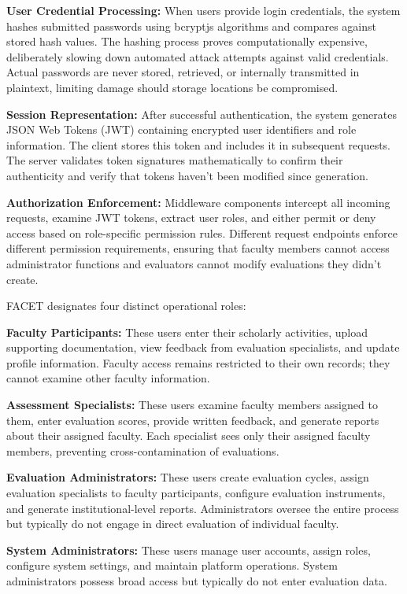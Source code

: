 \documentclass[conference]{IEEEtran}
\begin{document}
\textbf{User Credential Processing:} When users provide login credentials, the system hashes submitted passwords using bcryptjs algorithms and compares against stored hash values. The hashing process proves computationally expensive, deliberately slowing down automated attack attempts against valid credentials. Actual passwords are never stored, retrieved, or internally transmitted in plaintext, limiting damage should storage locations be compromised.

\textbf{Session Representation:} After successful authentication, the system generates JSON Web Tokens (JWT) containing encrypted user identifiers and role information. The client stores this token and includes it in subsequent requests. The server validates token signatures mathematically to confirm their authenticity and verify that tokens haven't been modified since generation.

\textbf{Authorization Enforcement:} Middleware components intercept all incoming requests, examine JWT tokens, extract user roles, and either permit or deny access based on role-specific permission rules. Different request endpoints enforce different permission requirements, ensuring that faculty members cannot access administrator functions and evaluators cannot modify evaluations they didn't create.

FACET designates four distinct operational roles:

\textbf{Faculty Participants:} These users enter their scholarly activities, upload supporting documentation, view feedback from evaluation specialists, and update profile information. Faculty access remains restricted to their own records; they cannot examine other faculty information.

\textbf{Assessment Specialists:} These users examine faculty members assigned to them, enter evaluation scores, provide written feedback, and generate reports about their assigned faculty. Each specialist sees only their assigned faculty members, preventing cross-contamination of evaluations.

\textbf{Evaluation Administrators:} These users create evaluation cycles, assign evaluation specialists to faculty participants, configure evaluation instruments, and generate institutional-level reports. Administrators oversee the entire process but typically do not engage in direct evaluation of individual faculty.

\textbf{System Administrators:} These users manage user accounts, assign roles, configure system settings, and maintain platform operations. System administrators possess broad access but typically do not enter evaluation data.
\end{document}
